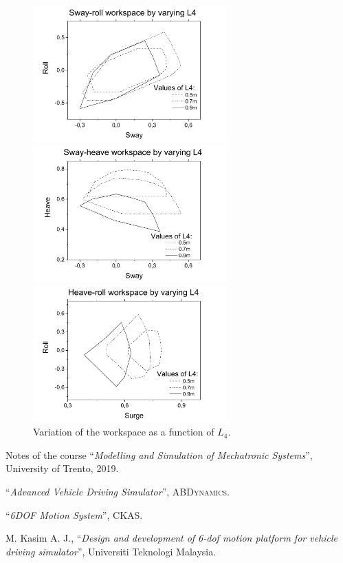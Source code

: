 \documentclass[10.5pt, twocolumn]{article}
\newcommand{\Virgolette}[1]{``#1''}
\begin{document}
\begin{figure}
\centering
\begin{minipage}{0.49\textwidth}
	\includegraphics[width=7.5cm]{Images/ws_l4_xa}
\end{minipage}
\begin{minipage}{0.49\textwidth}
	\includegraphics[width=7.5cm]{Images/ws_l4_xy}
\end{minipage}
\begin{minipage}{0.49\textwidth}
	\includegraphics[width=7.5cm]{Images/ws_l4_ya}
\end{minipage}
    \caption{Variation of the workspace as a function of \( L_4 \).}
    \label{fig:ws_4}
\end{figure}



\clearpage
\restoregeometry


\begin{thebibliography}{}
Notes of the course \Virgolette{\textit{Modelling and Simulation of Mechatronic Systems}}, University of Trento, 2019.

\Virgolette{\textit{Advanced Vehicle Driving Simulator}}, \textsc{ABDynamics}.

\Virgolette{\textit{6DOF Motion System}}, \textsc{CKAS}.

M. Kasim A. J., \Virgolette{\textit{Design and development of 6-dof motion platform for vehicle driving simulator}}, Universiti Teknologi Malaysia.
\end{thebibliography}
\end{document}
